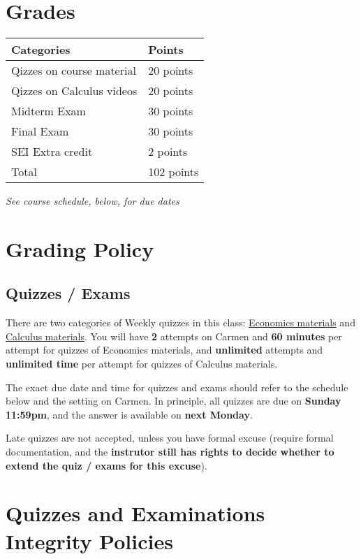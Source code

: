 \documentclass[12pt]{article}
\begin{document}
\newpage

\section*{Grades}

\newlength\q
\setlength{}
\begin{tabular}{|p{\q}|p{\q}|}
    \hline
    Categories  & Points \\
    \hline
    \hline
    Qizzes on course material   & 20 points \\
    \hline
    Qizzes on Calculus videos & 20 points \\
    \hline
    Midterm Exam & 30 points \\
    \hline
    Final Exam & 30 points \\
    \hline
    SEI Extra credit & 2 points \\
    \hline
    Total & 102 points \\
    \hline
\end{tabular}
\textit{See course schedule, below, for due dates}


\section*{Grading Policy}

\subsection*{Quizzes / Exams}

There are two categories of Weekly quizzes in this class: \underline{Economics materials} and \underline{Calculus materials}.
You will have \textbf{2} attempts on Carmen and \textbf{60 minutes} per attempt for quizzes of Economics materials, and \textbf{unlimited} attempts and \textbf{unlimited time} per attempt for quizzes of Calculus materials.

The exact due date and time for quizzes and exams should refer to the schedule below and the setting on Carmen.
In principle, all quizzes are due on \textbf{Sunday 11:59pm}, and the answer is available on \textbf{next Monday}.

Late quizzes are not accepted, unless you have formal excuse (require formal documentation, and the \textbf{instrutor still has rights to decide whether to extend the quiz / exams for this excuse}).

\section*{Quizzes and Examinations Integrity Policies}
\end{document}
